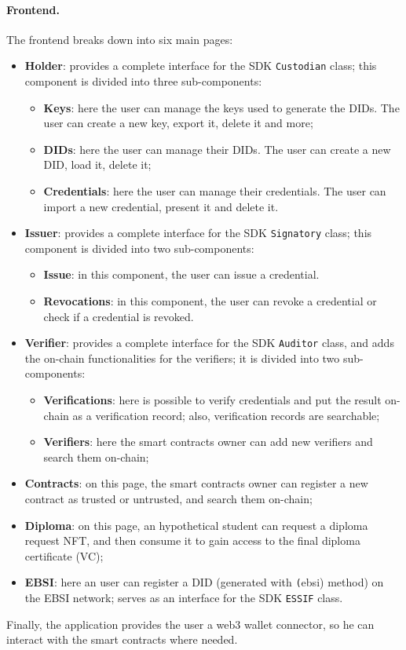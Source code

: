 \paragraph{Frontend.}
The frontend breaks down into six main pages:
\begin{itemize}
    \item \textbf{Holder}: provides a complete interface for the SDK \texttt{Custodian}
    class; this component is divided into three sub-components:
    \begin{itemize}
        \item[] \textbf{Keys}: here the user can manage the keys used to generate
        the DIDs. The user can create a new key, export it, delete it and more;
        \item[] \textbf{DIDs}: here the user can manage their DIDs. The user can create
        a new DID, load it, delete it;
        \item[] \textbf{Credentials}: here the user can manage their credentials. The
        user can import a new credential, present it and delete it.
    \end{itemize}
    \item \textbf{Issuer}: provides a complete interface for the SDK \texttt{Signatory}
    class; this component is divided into two sub-components:
    \begin{itemize}
        \item[] \textbf{Issue}: in this component, the user can issue a credential.
        \item[] \textbf{Revocations}: in this component, the user can revoke a credential
        or check if a credential is revoked.
    \end{itemize}
    \item \textbf{Verifier}: provides a complete interface for the SDK \texttt{Auditor}
    class, and adds the on-chain functionalities for the verifiers; it is divided into 
    two sub-components:
    \begin{itemize}
        \item[] \textbf{Verifications}: here is possible to verify credentials and put the
        result on-chain as a verification record; also, verification records are searchable;
        \item[] \textbf{Verifiers}: here the smart contracts owner can add new verifiers
        and search them on-chain;
    \end{itemize}
    \item \textbf{Contracts}: on this page, the smart contracts owner can register a new
    contract as trusted or untrusted, and search them on-chain;
    \item \textbf{Diploma}: on this page, an hypothetical student can request a diploma request
    NFT, and then consume it to gain access to the final diploma certificate (VC);
    \item \textbf{EBSI}: here an user can register a DID (generated with \texttt(ebsi)
    method) on the EBSI network; serves as an interface for the SDK \texttt{ESSIF} class.
\end{itemize}
Finally, the application provides the user a web3\cite{site:web3wiki} wallet 
connector, so he can interact with the smart contracts where needed.

